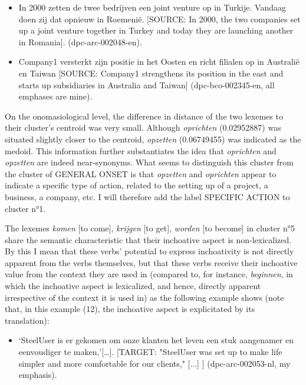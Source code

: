 \begin{itemize}
\item \begin{styleVoorbeeld}
In 2000 zetten de twee bedrijven een joint venture op in Turkije. Vandaag doen zij dat opnieuw in Roemenië. [SOURCE: In 2000, the two companies set up a joint venture together in Turkey and today they are launching another in Romania]. (dpc-arc-002048-en).
\end{styleVoorbeeld}
\item \begin{styleVoorbeeld}
Company1 versterkt zijn positie in het Oosten en richt filialen op in Australië en Taiwan [SOURCE: Company1 strengthens its position in the east and starts up subsidiaries in Australia and Taiwan] (dpc-bco-002345-en, all emphases are mine).
\end{styleVoorbeeld}
\end{itemize}

On the onomasiological level, the difference in distance of the two lexemes to their cluster’s centroid was very small. Although \textit{oprichten} (0.02952887) was situated slightly closer to the centroid, \textit{opzetten} (0.06749455) was indicated as the medoid. This information further substantiates the idea that \textit{oprichten} and \textit{opzetten} are indeed near-synonyms. What seems to distinguish this cluster from the cluster of GENERAL ONSET is that \textit{opzetten} and \textit{oprichten} appear to indicate a specific type of action, related to the setting up of a project, a business, a company, etc. I will therefore add the label SPECIFIC ACTION to cluster n°1.

The lexemes \textit{komen} [to come], \textit{krijgen} [to get], \textit{worden} [to become] in cluster n°5 share the semantic characteristic that their inchoative aspect is non-lexicalized. By this I mean that these verbs’ potential to express inchoativity is not directly apparent from the verbs themselves, but that these verbs receive their inchoative value from the context they are used in (compared to, for instance, \textit{beginnen}, in which the inchoative aspect is lexicalized, and hence, directly apparent irrespective of the context it is used in) as the following example shows (note that, in this example (12), the inchoative aspect is explicitated by its translation):

\begin{itemize}
\item \begin{styleVoorbeeld}
`SteelUser is er gekomen om onze klanten het leven een stuk aangenamer en eenvoudiger te maken,'[…]. [TARGET: "SteelUser was set up to make life simpler and more comfortable for our clients," [...] ] (dpc-arc-002053-nl, my emphasis).
\end{styleVoorbeeld}
\end{itemize}

